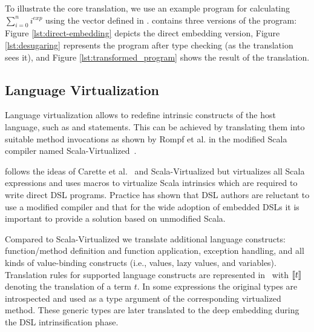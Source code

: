 To illustrate the core translation, we use an example program for calculating $\sum_{i=0}^n i^{exp}$ using the vector \edsl defined in .  contains three versions of the program: Figure \ref{lst:direct-embedding} depicts the direct embedding version, Figure \ref{lst:desugaring} represents the program after type checking (as the translation sees it), and Figure \ref{lst:transformed_program} shows the result of the translation.

\subsection{Language Virtualization}
\label{sct:langauge-virtualization}
Language virtualization allows to redefine intrinsic constructs of the
host language, such as  and  statements. This can be
achieved by translating them into suitable method invocations as shown by Rompf
et al. in the modified Scala compiler named Scala-Virtualized~\cite{rompf_scala-virtualized:_2009}.


 \yy follows the ideas of Carette et al.~\cite{carette_finally_2009}
 and Scala-Virtualized but virtualizes all Scala expressions and uses macros to virtualize Scala intrinsics
  which are required to write direct DSL programs. Practice has shown that DSL
  authors are reluctant to use a modified compiler and that for the wide adoption
  of embedded DSLs it is important to provide a solution based on unmodified Scala.

 Compared to Scala-Virtualized we translate additional language constructs:
  function/method definition and function application, exception handling, and all kinds of value-binding constructs
  (i.e., values, lazy values, and variables). Translation rules for supported language constructs are
  represented in~ with $\llbracket t \rrbracket$ denoting the translation of a term $t$. In some expressions
  the original types are introspected and used as a type argument of the corresponding virtualized method. These
  generic types are later translated to the deep embedding during the DSL intrinsification phase.

